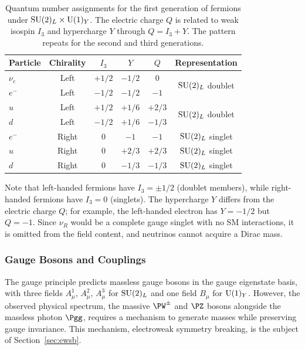 \begin{table}[htbp]
\centering
\caption{Quantum number assignments for the first generation of fermions under $\mathrm{SU}(2)_L \times \mathrm{U}(1)_Y$. The electric charge $Q$ is related to weak isospin $I_3$ and hypercharge $Y$ through $Q = I_3 + Y$. The pattern repeats for the second and third generations.}
\label{tab:fermion_quantum_numbers}
\begin{tabular}{lccccc}
\hline\hline
Particle & Chirality & $I_3$ & $Y$ & $Q$ & Representation \\
\hline
$\nu_e$ & Left & $+1/2$ & $-1/2$ & $0$ & \multirow{2}{*}{$\mathrm{SU}(2)_L$ doublet} \\
$e^-$ & Left & $-1/2$ & $-1/2$ & $-1$ & \\
$u$ & Left & $+1/2$ & $+1/6$ & $+2/3$ & \multirow{2}{*}{$\mathrm{SU}(2)_L$ doublet} \\
$d$ & Left & $-1/2$ & $+1/6$ & $-1/3$ & \\
\hline
$e^-$ & Right & $0$ & $-1$ & $-1$ & $\mathrm{SU}(2)_L$ singlet \\
$u$ & Right & $0$ & $+2/3$ & $+2/3$ & $\mathrm{SU}(2)_L$ singlet \\
$d$ & Right & $0$ & $-1/3$ & $-1/3$ & $\mathrm{SU}(2)_L$ singlet \\
\hline\hline
\end{tabular}
\end{table}

Note that left-handed fermions have $I_3 = \pm 1/2$ (doublet members), while right-handed fermions have $I_3 = 0$ (singlets). The hypercharge $Y$ differs from the electric charge $Q$; for example, the left-handed electron has $Y = -1/2$ but $Q = -1$. Since $\nu_R$ would be a complete gauge singlet with no SM interactions, it is omitted from the field content, and neutrinos cannot acquire a Dirac mass.

\subsubsection{Gauge Bosons and Couplings}

The gauge principle predicts massless gauge bosons in the gauge eigenstate basis, with three fields $A^1_\mu$, $A^2_\mu$, $A^3_\mu$ for $\mathrm{SU}(2)_L$ and one field $B_\mu$ for $\mathrm{U}(1)_Y$. However, the observed physical spectrum, the massive $\PW^\pm$ and $\PZ$ bosons alongside the massless photon $\Pgg$, requires a mechanism to generate masses while preserving gauge invariance. This mechanism, electroweak symmetry breaking, is the subject of Section~\ref{sec:ewsb}.

